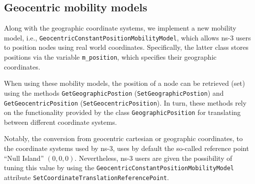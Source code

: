 
\subsection{Geocentric mobility models}
\label{sub:mobility}
Along with the geographic coordinate systems, we implement a new mobility model, i.e., \texttt{Geocentric\-Constant\-Position\-Mobility\-Model}, which allows ns-3 users to position nodes using real world coordinates.
Specifically, the latter class stores positions via the variable \verb|m_position|, which specifies their geographic coordinates.

When using these mobility models, the position of a node can be retrieved (set) using the methods \texttt{Get\-Geographic\-Postion} (\texttt{Set\-Geographic\-Postion}) and \texttt{Get\-Geocentric\-Position} (\texttt{Set\-Geocentric\-Position}). In turn, these methods rely on the functionality provided by the class \texttt{Geographic\-Position} for translating between different coordinate systems. 

Notably, the conversion from geocentric cartesian or geographic coordinates, to the coordinate systems used by ns-3, uses by default the so-called reference point ``{Null Island}'' $(0,0,0)$. Nevertheless, ns-3 users are given the possibility of tuning this value by using the \texttt{Geocentric\-Constant\-Position\-Mobility\-Model} attribute \texttt{Set\-Coordinate\-Translation\-Reference\-Point}.




